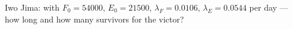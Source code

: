 Iwo Jima: with $F_0=54000$, $E_0=21500$, $\lambda_F=0.0106$, $\lambda_E=0.0544$ per day — how long and how many survivors for the victor?